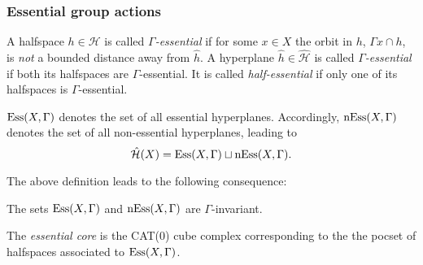 \begin{bsp}[\(\R^d\)]
\end{bsp}

\subsubsection*{Essential group actions}
\label{sec:essential}

\begin{defin}
  A halfspace \(h \in \mathcal{H}\) is called \emph{\(\Gamma\)-essential} if for some \(x \in X\) the orbit in \(h\), \(\Gamma x \cap h\), is \emph{not} a bounded distance away from \(\hat h\). A hyperplane \(\hat h \in \mathcal{\hat H}\) is called \emph{\(\Gamma\)-essential} if both its halfspaces are \(\Gamma\)-essential. It is called \emph{half-essential} if only one of its halfspaces is \(\Gamma\)-essential.

  \(\operatorname{Ess}(X,\Gamma)\) denotes the set of all essential hyperplanes. Accordingly, \(\operatorname{nEss}(X,\Gamma)\) denotes the set of all non-essential hyperplanes, leading to
  \[
    \mathcal{\hat H}(X) = \operatorname{Ess}(X, \Gamma) \sqcup \operatorname{nEss}(X, \Gamma).
  \]
\end{defin}

The above definition leads to the following consequence:

\begin{prop}
  The sets \(\operatorname{Ess}(X, \Gamma)\) and \(\operatorname{nEss}(X, \Gamma)\) are \(\Gamma\)-invariant.
\end{prop}

\begin{defin}
  The \emph{essential core} is the CAT(0) cube complex corresponding to the the pocset of halfspaces associated to \(\operatorname{Ess}(X, \Gamma)\).
\end{defin}

